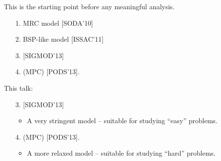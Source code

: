 \documentclass{beamer}
\def\vgap{\vspace{5mm}}
\begin{document}
\begin{frame}
\begin{small}
    
    \vgap 

    This is the starting point before any meaningful analysis.
    
    \vgap
    
    \begin{tcolorbox}[arc=0mm, colframe=blue!50!black, colback=blue!10!white] 
        \begin{enumerate} 
            \item[1.] MRC model [SODA'10]  
            \item[2.] BSP-like model [ISSAC'11]
        \end{enumerate}
    \end{tcolorbox}
    
        
    \begin{tcolorbox}[arc=0mm, colframe=green!50!black, colback=green!10!white] 
        \begin{enumerate}
        \item[3.]  [SIGMOD'13] 
        \item[4.]  (MPC) [PODS'13]. 
        \end{enumerate}
    \end{tcolorbox}
    
\end{small}
\end{frame}
\begin{frame}
\begin{small}
    
    \vgap 

    This talk:
    
    \vgap
        
    \begin{tcolorbox}[arc=0mm, colframe=green!50!black, colback=green!10!white] 
        \begin{enumerate}
        \item[3.]  [SIGMOD'13] 
        \begin{itemize} 
            \item A very stringent model -- suitable for studying ``easy'' problems.
        \end{itemize}

        \item[4.]  (MPC) [PODS'13]. 
        \begin{itemize} 
            \item A more relaxed model -- suitable for studying ``hard'' problems.
        \end{itemize}

        \end{enumerate}
    \end{tcolorbox}
    
\end{small}
\end{frame}
\end{document}
